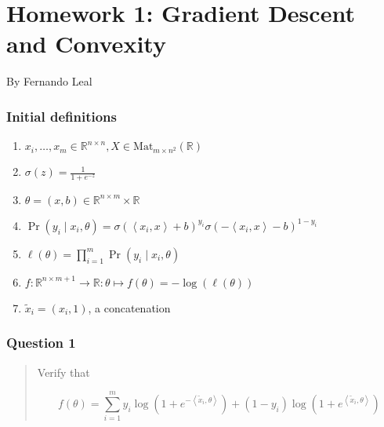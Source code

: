 \documentclass[
]{article}
\author{}
\date{}
\begin{document}
\hypertarget{homework-1-gradient-descent-and-convexity}{%
\section{Homework 1: Gradient Descent and
Convexity}\label{homework-1-gradient-descent-and-convexity}}

By Fernando Leal

\hypertarget{initial-definitions}{%
\subsubsection{Initial definitions}\label{initial-definitions}}

\begin{enumerate}
\def\labelenumi{\arabic{enumi}.}
\item
  \(x_i, \dots, x_m \in \mathbb{R}^{n\times n}, X\in\text{Mat}_{m \times n^2}(\mathbb{R})\)
\item
  \(\sigma(z) = \frac{1}{1+e^{-z}}\)
\item
  \(\theta = (x,b) \in \mathbb{R}^{n\times m}\times \mathbb{R}\)
\item
  \(\Pr(y_i \mid x_i, \theta) = \sigma(\left<x_i,x\right> + b)^{y_i}\sigma(-\left<x_i,x\right> - b)^{1-y_i}\)
\item
  \(\ell(\theta)=\prod_{i=1}^{m}\Pr(y_i\mid x_i,\theta)\)
\item
  \(f:\mathbb{R}^{n\times m + 1}\to\mathbb{R}:\theta\mapsto f(\theta) = -\log(\ell(\theta))\)
\item
  \(\tilde{x}_i = (x_i,1)\), a concatenation
\end{enumerate}

\hypertarget{question-1}{%
\subsubsection{Question 1}\label{question-1}}

\begin{quote}
Verify that

\[f(\theta) = 
\sum_{i=1}^{m}y_i\log(1+e^{-\left<\tilde{x}_i,\theta\right>}) + (1- y_i)\log(1+e^{\left<\tilde{x}_i, \theta\right>})\]
\end{quote}
\end{document}
